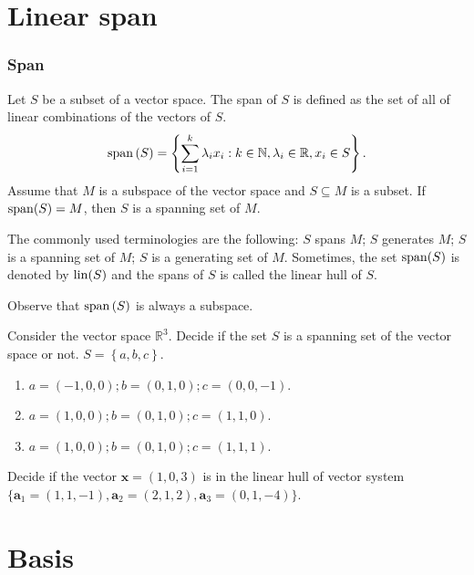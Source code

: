 \section{Linear span}
\begin{frame}\frametitle{Span}
    \begin{definition}
    Let $S$ be a subset of a vector space.
    The \alert{span} of $S$ is defined as the set of all of linear combinations of the vectors of $S$.
    \[
        \operatorname{span}\left( S \right)
        =
        \left\{ \sum_{i=1}^k\lambda_ix_i:k\in\mathbb{N},\lambda_i\in\mathbb{R}, x_i\in S \right\}.
    \]
    Assume that $M$ is a subspace of the vector space and $S\subseteq M$ is a subset.
    If $\operatorname{span}(S)=M$, then $S$ is a \alert{spanning set of } $M$.
    \end{definition}
    The commonly used terminologies are the following:
    $S$ spans $M$; $S$ generates $M$; $S$ is a spanning set of $M$; $S$ is a generating set of $M$.
    Sometimes, the set $\operatorname{span}(S)$ is denoted by $\operatorname{lin}(S)$ and the spans of $S$ is called \alert{the linear hull} of $S$.

    Observe that $\operatorname{span}\left( S \right)$ is always a subspace.
\end{frame}
\begin{frame}
    \begin{example}
        Consider the vector space $\mathbb{R}^3$.
        Decide if the set $S$ is a spanning set of the vector space or not.
        $S=\left\{ a,b,c \right\}$.
        \begin{enumerate}
            \item $a=(-1,0,0); b=\left( 0,1,0 \right); c=\left( 0,0,-1 \right)$.
            \item $a=(1,0,0); b=\left( 0,1,0 \right); c=\left( 1,1,0 \right)$.
            \item $a=(1,0,0); b=\left( 0,1,0 \right); c=\left( 1,1,1 \right)$.
        \end{enumerate}
    \end{example}
\end{frame}
\begin{frame}
\begin{example}
Decide if the vector $\mathbf{x}=(1,0,3)$ is in the linear hull of vector system $\{\mathbf{a}_1=(1,1,-1),\mathbf{a}_2=(2,1,2),\mathbf{a}_3=(0,1,-4)\}.$
\end{example}
\end{frame}
\section{Basis}

